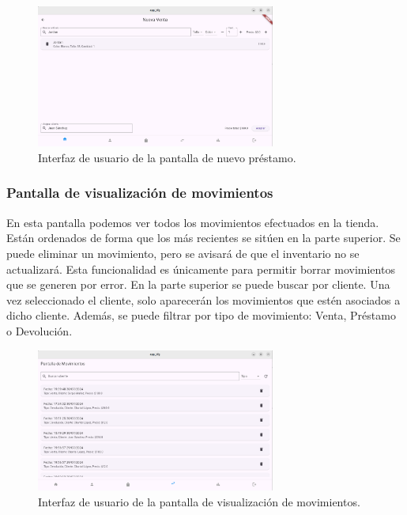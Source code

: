 \begin{figure}[H]
	\centering
	\includegraphics[width=0.7\textwidth]{imagenes/SegundaIteracion/nuevoPrestamo.png}
	\caption{Interfaz de usuario de la pantalla de nuevo préstamo.}
	\label{fig:appPantallaNuevoPrestamo}
\end{figure}

\subsubsection{Pantalla de visualización de movimientos}

En esta pantalla podemos ver todos los movimientos efectuados en la tienda. Están ordenados de forma que los más recientes se sitúen en la parte superior. Se puede eliminar un movimiento, pero se avisará de que el inventario no se actualizará. Esta funcionalidad es únicamente para permitir borrar movimientos que se generen por error. En la parte superior se puede buscar por cliente. Una vez seleccionado el cliente, solo aparecerán los movimientos que estén asociados a dicho cliente. Además, se puede filtrar por tipo de movimiento: Venta, Préstamo o Devolución. 

\begin{figure}[H]
	\centering
	\includegraphics[width=0.7\textwidth]{imagenes/SegundaIteracion/listaMovimientos.png}
	\caption{Interfaz de usuario de la pantalla de visualización de movimientos.}
	\label{fig:appPantallaVisualizarMovimientos}
\end{figure}


